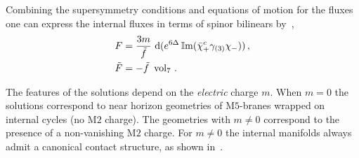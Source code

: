 \documentclass[debug]{phd}
\begin{document}
Combining the supersymmetry conditions and equations of motion for the fluxes one can express the internal fluxes in terms of spinor bilinears by~\cite{Gabella:2012rc},
%
	\begin{align}
		F &= \dfrac{3 m}{\tilde{f}}\ \mathrm{d}  (e^{6 \Delta} \operatorname{\mathbb{I}m}( \bar{\chi}_+^c \gamma_{(3)} \chi_-))\, , \\
		\tilde{F} &= - \tilde{f}\ \operatorname{vol}_7 \, . 
	\end{align}
%

The features of the solutions depend on the \emph{electric} charge $m$. 
When $m=0$ the solutions correspond to near horizon geometries of $\mathrm{M}5$-branes wrapped on internal cycles (no $\mathrm{M}2$ charge). 
The geometries with $m\neq0$ correspond to the presence of a non-vanishing $\mathrm{M}2$ charge. 
For $m \neq 0$ the internal manifolds always admit a canonical contact structure, as shown in~\cite{Gabella:2012rc}. \\
\end{document}
